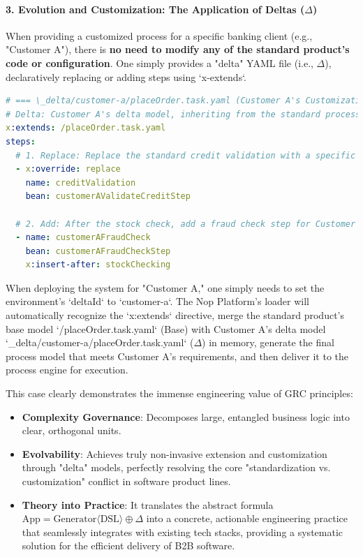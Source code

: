 \documentclass[11pt]{article}
\begin{document}
\paragraph{3. Evolution and Customization: The Application of Deltas ($\Delta$)}
When providing a customized process for a specific banking client (e.g., "Customer A"), there is \textbf{no need to modify any of the standard product's code or configuration}. One simply provides a "delta" YAML file (i.e., $\Delta$), declaratively replacing or adding steps using `x-extends`.

\begin{lstlisting}[language=YAML, caption={Customization Delta Model for Customer A}]
# === \_delta/customer-a/placeOrder.task.yaml (Customer A's Customization) ===
# Delta: Customer A's delta model, inheriting from the standard process
x:extends: /placeOrder.task.yaml
steps:
  # 1. Replace: Replace the standard credit validation with a specific version
  - x:override: replace
    name: creditValidation
    bean: customerAValidateCreditStep

  # 2. Add: After the stock check, add a fraud check step for Customer A
  - name: customerAFraudCheck
    bean: customerAFraudCheckStep
    x:insert-after: stockChecking
\end{lstlisting}
When deploying the system for "Customer A," one simply needs to set the environment's `deltaId` to `customer-a`. The Nop Platform's loader will automatically recognize the `x:extends` directive, merge the standard product's base model `/placeOrder.task.yaml` (Base) with Customer A's delta model `\_delta/customer-a/placeOrder.task.yaml` ($\Delta$) in memory, generate the final process model that meets Customer A's requirements, and then deliver it to the process engine for execution.

This case clearly demonstrates the immense engineering value of GRC principles:
\begin{itemize}
    \item \textbf{Complexity Governance}: Decomposes large, entangled business logic into clear, orthogonal units.
    \item \textbf{Evolvability}: Achieves truly non-invasive extension and customization through "delta" models, perfectly resolving the core "standardization vs. customization" conflict in software product lines.
    \item \textbf{Theory into Practice}: It translates the abstract formula $\text{App} = \text{Generator}\langle\text{DSL}\rangle \oplus \Delta$ into a concrete, actionable engineering practice that seamlessly integrates with existing tech stacks, providing a systematic solution for the efficient delivery of B2B software.
\end{itemize}
\end{document}
